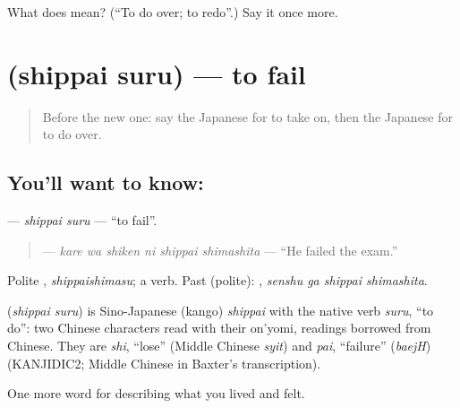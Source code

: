 \begin{tcolorbox}[breakable,colback=teal!4,colframe=teal!35!black,title={Before you move on}]
What does  mean? (\textquotedblleft{}To do over; to redo\textquotedblright{}.) Say it once more.
\end{tcolorbox}
\section[\texorpdfstring{\ja{しっぱいする} (shippai suru)}{しっぱいする (shippai suru)}]{ (shippai suru) — to fail}

\label{lesson:JA-C454-shippai-suru}



\begin{quote}
Before the new one: say the Japanese for to take on, then the Japanese for to do over.
\end{quote}

\subsection*{You'll want to know: }
\textbf{} — \emph{shippai suru} — \textquotedblleft{}to fail\textquotedblright{}.

\begin{quote}
\textbf{  } — \emph{kare wa shiken ni shippai shimashita} — \textquotedblleft{}He failed the exam.\textquotedblright{}
\end{quote}

Polite \textbf{}, \emph{shippaishimasu}; a  verb. Past (polite): \textbf{ }, \emph{senshu ga shippai shimashita}.

\begin{cousinweb}
\textbf{} (\emph{shippai suru}) is Sino-Japanese (kango) \emph{shippai} with the native verb \emph{suru}, \textquotedblleft{}to do\textquotedblright{}: two Chinese characters read with their on'yomi, readings borrowed from Chinese. They are \emph{shi}, \textquotedblleft{}lose\textquotedblright{} (Middle Chinese \emph{syit}) and \emph{pai}, \textquotedblleft{}failure\textquotedblright{} (\emph{baejH}) (KANJIDIC2; Middle Chinese in Baxter's transcription).
\end{cousinweb}

\begin{grammarlens}[title={What you've built}]
One more word for describing what you lived and felt.
\end{grammarlens}

